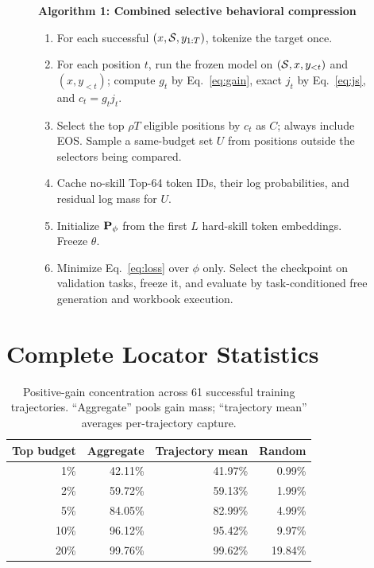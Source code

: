 \begin{figure}[h]
\small
\begin{minipage}{0.96\linewidth}
\textbf{Algorithm 1: Combined selective behavioral compression}
\begin{enumerate}
    \item For each successful $(x,\mathcal{S},y_{1:T})$, tokenize the target once.
    \item For each position $t$, run the frozen model on $(\mathcal{S},x,y_{<t})$ and $(x,y_{<t})$; compute $g_t$ by Eq.~\ref{eq:gain}, exact $j_t$ by Eq.~\ref{eq:js}, and $c_t=g_tj_t$.
    \item Select the top $\rho T$ eligible positions by $c_t$ as $C$; always include EOS.  Sample a same-budget set $U$ from positions outside the selectors being compared.
    \item Cache no-skill Top-64 token IDs, their log probabilities, and residual log mass for $U$.
    \item Initialize $\mathbf{P}_\phi$ from the first $L$ hard-skill token embeddings.  Freeze $\theta$.
    \item Minimize Eq.~\ref{eq:loss} over $\phi$ only.  Select the checkpoint on validation tasks, freeze it, and evaluate by task-conditioned free generation and workbook execution.
\end{enumerate}
\end{minipage}
\end{figure}

\section{Complete Locator Statistics}
\label{app:locator}

\begin{table}[h]
\caption{Positive-gain concentration across 61 successful training trajectories.  ``Aggregate'' pools gain mass; ``trajectory mean'' averages per-trajectory capture.}
\centering
\small
\begin{tabular}{rrrr}
\toprule
Top budget & Aggregate & Trajectory mean & Random \\
\midrule
1\%  & 42.11\% & 41.97\% & 0.99\% \\
2\%  & 59.72\% & 59.13\% & 1.99\% \\
5\%  & 84.05\% & 82.99\% & 4.99\% \\
10\% & 96.12\% & 95.42\% & 9.97\% \\
20\% & 99.76\% & 99.62\% & 19.84\% \\
\bottomrule
\end{tabular}
\end{table}

